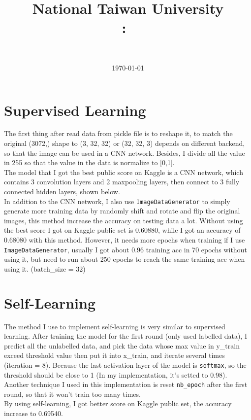 \documentclass[11pt]{article}
\title{
{National Taiwan University}\\    
    \textmd{\textbf{\Class:\ \Title}}
}
\author{
	\Department \ \AuthorID \\
	\textbf{\AuthorName}
}
\date{
	\today \\
	\horline{1pt}
}
\newcommand\n{\mbox{\qquad}}
\begin{document}
\maketitle
\section{Supervised Learning}
\n The first thing after read data from pickle file is to reshape it, to match the original (3072,) shape to (3, 32, 32) or (32, 32, 3) depends on different backend, so that the image can be used in a CNN network. Besides, I divide all the value in 255 so that the value in the data is normalize to [0,1].\\
\n The model that I got the best public score on Kaggle is a CNN network, which contains 3 convolution layers and 2 maxpooling layers, then connect to 3 fully connected hidden layers, shown below.\\
\n In addition to the CNN network, I also use \texttt{ImageDataGenerator} to simply generate more training data by randomly shift and rotate and flip the original images, this method increase the accuracy on testing data a lot. Without using  the best score I got on Kaggle public set is 0.60880, while I got an accuracy of 0.68080 with this method. However, it needs more epochs when training if I use \texttt{ImageDataGenerator}, usually I got about 0.96 training acc in 70 epochs without using it, but need to run about 250 epochs to reach the same training acc when using it. (batch\_size = 32)


\section{Self-Learning}
\n The method I use to implement self-learning is very similar to supervised learning. After training the model for the first round (only used labelled data), I predict all the unlabelled data, and pick the data whose max value in y\_train exceed threshold value then put it into x\_train, and iterate several times (iteration = 8). Because the last activation layer of the model is \texttt{softmax}, so the threshold should be close to 1 (In my implementation, it's setted to 0.98). \\
\n Another technique I used in this implementation is reset \texttt{nb\_epoch} after the first round, so that it won't train too many times.\\
\n By using self-learning, I got better score on Kaggle public set, the accuracy increase to 0.69540.

\end{document}
